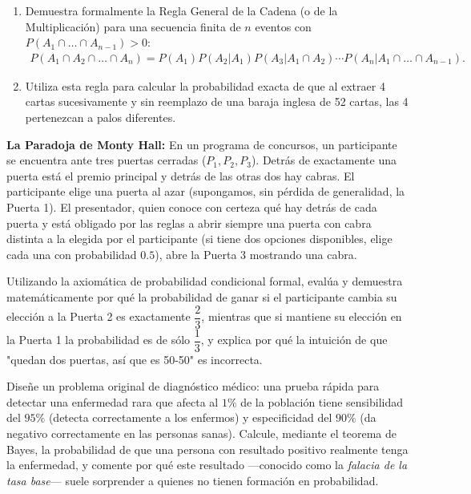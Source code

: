 \begin{problema}
	\label{prob:8a7282b}
	\begin{enumerate}
		\item Demuestra formalmente la Regla General de la Cadena (o de la Multiplicación) para una secuencia finita de $n$ eventos con $P(A_1 \cap \dots \cap A_{n-1}) > 0$:
		\begin{align}
			P(A_1 \cap A_2 \cap \dots \cap A_n) = P(A_1)P(A_2|A_1)P(A_3|A_1 \cap A_2) \cdots P(A_n|A_1 \cap \dots \cap A_{n-1}).
		\end{align}
		\item Utiliza esta regla para calcular la probabilidad exacta de que al extraer 4 cartas sucesivamente y sin reemplazo de una baraja inglesa de 52 cartas, las 4 pertenezcan a palos diferentes.
	\end{enumerate}
\end{problema}

\begin{problema}
	\label{prob:c840e8f}
	\textbf{La Paradoja de Monty Hall:} En un programa de concursos, un participante se encuentra ante tres puertas cerradas ($P_1, P_2, P_3$). Detrás de exactamente una puerta está el premio principal y detrás de las otras dos hay cabras. El participante elige una puerta al azar (supongamos, sin pérdida de generalidad, la Puerta 1). El presentador, quien conoce con certeza qué hay detrás de cada puerta y está obligado por las reglas a abrir siempre una puerta con cabra distinta a la elegida por el participante (si tiene dos opciones disponibles, elige cada una con probabilidad $0.5$), abre la Puerta 3 mostrando una cabra.

	Utilizando la axiomática de probabilidad condicional formal, evalúa y demuestra matemáticamente por qué la probabilidad de ganar si el participante cambia su elección a la Puerta 2 es exactamente $\dfrac{2}{3}$, mientras que si mantiene su elección en la Puerta 1 la probabilidad es de sólo $\dfrac{1}{3}$, y explica por qué la intuición de que "quedan dos puertas, así que es 50-50" es incorrecta.
\end{problema}

\begin{problema}
	\label{prob:4241cab}
	Diseñe un problema original de diagnóstico médico: una prueba rápida para detectar una enfermedad rara que afecta al $1\%$ de la población tiene sensibilidad del $95\%$ (detecta correctamente a los enfermos) y especificidad del $90\%$ (da negativo correctamente en las personas sanas). Calcule, mediante el teorema de Bayes, la probabilidad de que una persona con resultado positivo realmente tenga la enfermedad, y comente por qué este resultado —conocido como la \emph{falacia de la tasa base}— suele sorprender a quienes no tienen formación en probabilidad.
\end{problema}

